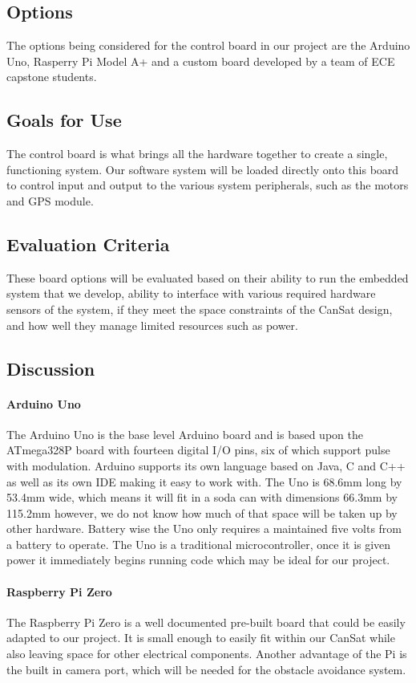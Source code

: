 \documentclass[10pt,letterpaper,onecolumn,journal]{IEEEtran}
\begin{document}
\subsection{Options}
The options being considered for the control board in our project are the Arduino Uno, Rasperry Pi Model A+ and a custom board developed by a team of ECE capstone students.
\subsection{Goals for Use}
The control board is what brings all the hardware together to create a single, functioning system. Our software system will be loaded directly onto this board to control input and output to the various system peripherals, such as the motors and GPS module.
\subsection{Evaluation Criteria}
These board options will be evaluated based on their ability to run the embedded system that we develop, ability to interface with various required hardware sensors of the system, if they meet the space constraints of the CanSat design, and how well they manage limited resources such as power.
\subsection{Discussion}
\paragraph{Arduino Uno}
The Arduino Uno is the base level Arduino board and is based upon the ATmega328P board with fourteen digital I/O pins, six of which support pulse with modulation\cite{Arduino}. Arduino supports its own language based on Java, C and C++ as well as its own IDE making it easy to work with. The Uno is 68.6mm long by 53.4mm wide, which means it will fit in a soda can with dimensions 66.3mm by 115.2mm however, we do not know how much of that space will be taken up by other hardware. Battery wise the Uno only requires a maintained five volts from a battery to operate. The Uno is a traditional microcontroller, once it is given power it immediately begins running code which may be ideal for our project.
\paragraph{Raspberry Pi Zero}
The Raspberry Pi Zero is a well documented pre-built board that could be easily adapted to our project. It is small enough to easily fit within our CanSat while also leaving space for other electrical components.\cite{PI} Another advantage of the Pi is the built in camera port, which will be needed for the obstacle avoidance system.
\end{document}
